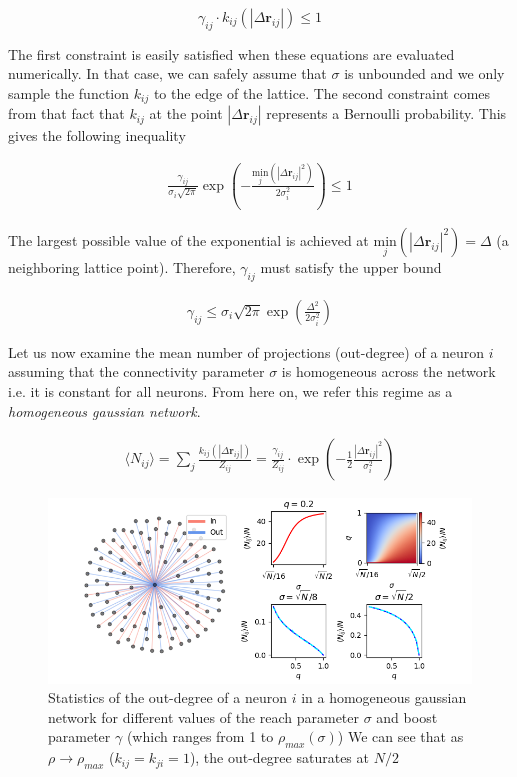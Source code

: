 \documentclass{ucetd}
\begin{document}
\begin{equation}
\gamma_{ij}\cdot k_{ij}(|\Delta\mathbf{r}_{ij}|) \leq 1
\end{equation}


The first constraint is easily satisfied when these equations are evaluated numerically. In that case, we can safely assume that $\sigma$ is unbounded and we only sample the function $k_{ij}$ to the edge of the lattice. The second constraint comes from that fact that $k_{ij}$ at the point $|\Delta\mathbf{r}_{ij}|$ represents a Bernoulli probability. This gives the following inequality

\begin{align*}
\frac{\gamma_{ij}}{\sigma_{i}\sqrt{2\pi}}\exp\left(-\frac{\underset{j}{\mathrm{min}}\left(|\Delta\mathbf{r}_{ij}|^{2}\right)}{2\sigma_{i}^{2}} \right) \leq 1
\end{align*}

The largest possible value of the exponential is achieved at $\underset{j}{\mathrm{min}}\left(|\Delta\mathbf{r}_{ij}|^{2}\right) = \Delta$ (a neighboring lattice point). Therefore, $\gamma_{ij}$ must satisfy the upper bound

\begin{align*}
\gamma_{ij} \leq \sigma_{i}\sqrt{2\pi}\exp\left(\frac{\Delta^{2}}{2\sigma_{i}^{2}}\right)
\end{align*}

Let us now examine the mean number of projections (out-degree) of a neuron $i$ assuming that the connectivity parameter $\sigma$ is homogeneous across the network i.e. it is constant for all neurons. From here on, we refer this regime as a \emph{homogeneous gaussian network}.

\begin{align*}
\langle N_{ij} \rangle = \sum_{j} \frac{k_{ij}(|\Delta\mathbf{r}_{ij}|)}{Z_{ij}} = \frac{\gamma_{ij}}{Z_{ij}}\cdot \exp\left(-\frac{1}{2}\frac{|\Delta\mathbf{r}_{ij}|^{2}}{\sigma_{i}^{2}} \right)
\end{align*}


\begin{figure}
\centering
\includegraphics[width=150mm]{fig_8}
\caption{Statistics of the out-degree of a neuron $i$ in a homogeneous gaussian network for different values of the reach parameter $\sigma$ and boost parameter $\gamma$ (which ranges from 1 to $\rho_{max}(\sigma)$) We can see that as $\rho \rightarrow \rho_{max}$ ($k_{ij} = k_{ji} = 1$), the out-degree saturates at $N/2$}
\end{figure}
\end{document}
